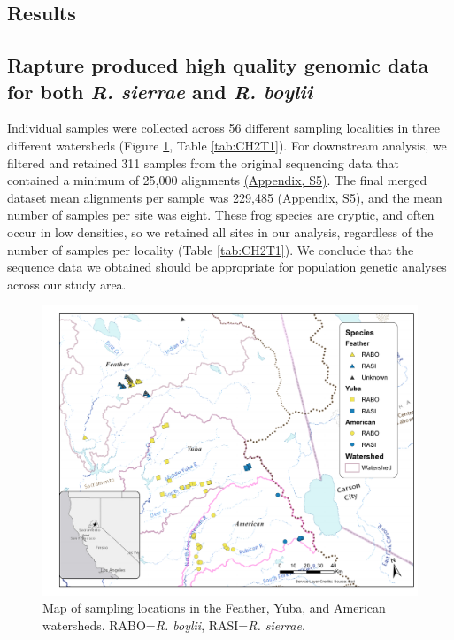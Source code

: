 \documentclass[proquest,12pt,final]{ucthesis-CA2012} %
\begin{document}
\begin{ucmainmatter}
\hypertarget{results-1}{%
\section{Results}\label{results-1}}

\hypertarget{rapture-produced-high-quality-genomic-data-for-both-r.-sierrae-and-r.-boylii}{%
\subsection{\texorpdfstring{Rapture produced high quality genomic data
for both \emph{R. sierrae} and \emph{R.
boylii}}{Rapture produced high quality genomic data for both R. sierrae and R. boylii}}\label{rapture-produced-high-quality-genomic-data-for-both-r.-sierrae-and-r.-boylii}}

Individual samples were collected across 56 different sampling
localities in three different watersheds (Figure \ref{fig:CH2F1map},
Table \ref{tab:CH2T1}). For downstream analysis, we filtered and
retained 311 samples from the original sequencing data that contained a
minimum of 25,000 alignments \protect\hyperlink{supptables}{(Appendix,
S5)}. The final merged dataset mean alignments per sample was 229,485
\protect\hyperlink{supptables}{(Appendix, S5)}, and the mean number of
samples per site was eight. These frog species are cryptic, and often
occur in low densities, so we retained all sites in our analysis,
regardless of the number of samples per locality (Table
\ref{tab:CH2T1}). We conclude that the sequence data we obtained should
be appropriate for population genetic analyses across our study area.



\begin{figure}
\includegraphics[angle=90, scale=.70]{figure/ch2/figure_01_overview_hybrid} \caption{Map of sampling locations in the Feather, Yuba, and
American watersheds. RABO=\emph{R. boylii}, RASI=\emph{R. sierrae}.}\label{fig:CH2F1map}
\end{figure}
\clearpage


\end{ucmainmatter}
\end{document}
